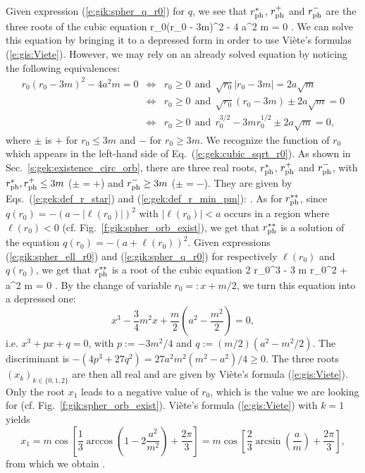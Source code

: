 Given expression (\ref{e:gik:spher_q_r0}) for $q$, we see that
$r_{\rm ph}^*$, $r_{\rm ph}^+$ and $r_{\rm ph}^-$
are the three roots of the cubic equation
\be
r_0(r_0 - 3m)^2 - 4 a^2 m  = 0 .
\ee
We can solve this equation by bringing it to a depressed form in order
to use Viète's formulas (\ref{e:gis:Viete}). However, we may rely on an
already solved equation by noticing the following equivalences:
\begin{eqnarray}
r_0(r_0 - 3m)^2 - 4 a^2 m  = 0  & \iff & r_0 \geq 0 \ \ \mbox{and} \ \
            \sqrt{r_0} | r_0 - 3 m | = 2 a\sqrt{m} \nonumber \\
& \iff &  r_0 \geq 0 \ \ \mbox{and} \ \
    \sqrt{r_0} (r_0 - 3 m ) \pm 2 a \sqrt{m} = 0 \nonumber \\
& \iff &  r_0 \geq 0 \ \ \mbox{and} \ \
    r_0^{3/2} - 3 m r_0^{1/2} \pm 2 a \sqrt{m} = 0 , \nonumber
\end{eqnarray}
where $\pm$ is $+$ for $r_0 \leq 3 m$ and $-$ for $r_0 \geq 3m$.
We recognize the function of $r_0$ which appears in the left-hand side
of Eq.~(\ref{e:gek:cubic_sqrt_r0}). As shown in Sec.~\ref{s:gek:existence_circ_orb},
there are three real roots,
$r_{\rm ph}^*$, $r_{\rm ph}^+$ and $r_{\rm ph}^-$, with
$r_{\rm ph}^*, r_{\rm ph}^+\leq 3m$ ($\pm = +$)
and $r_{\rm ph}^- \geq 3m$ ($\pm = -$). They are given by Eqs.~(\ref{e:gek:def_r_star})
and (\ref{e:gek:def_r_min_pm}):
\be \label{e:gik:rph_s}
    .
\ee
\be \label{e:gik:rph_pm}
   \encadre{ r_{\rm ph}^\pm := 4m\cos^2 \left[ \frac{1}{3} \arccos\left( \mp \frac{a}{m} \right) \right] }
\ee
As for $r_{\rm ph}^{**}$, since $q(r_0) = - (a - |\ell(r_0)|)^2$ with
$|\ell(r_0)|  < a$ occurs in a region where $\ell(r_0) < 0$ (cf. Fig.~\ref{f:gik:spher_orb_exist}),
we get that $r_{\rm ph}^{**}$ is a solution of the equation
$q(r_0) = - (a + \ell(r_0))^2$. Given expressions (\ref{e:gik:spher_ell_r0}) and (\ref{e:gik:spher_q_r0})
for respectively $\ell(r_0)$ and $q(r_0)$, we get that $r_{\rm ph}^{**}$ is a root of the cubic
equation
\be \label{e:gik:cubic_rph_ss}
    2 r_0^3 - 3 m r_0^2 + a^2 m = 0 .
\ee
By the change of variable $r_0 =: x + m/2$, we turn this equation into a depressed one:
\[
    x^3  - \frac{3}{4} m^2 x + \frac{m}{2} \left(a^2 - \frac{m^2}{2} \right) = 0 ,
\]
i.e. $x^3 + px + q = 0$, with $p:= -3m^2/4$ and $q:=(m/2)(a^2 - m^2/2)$.
The discriminant is $-(4 p^3 + 27 q^2) = 27 a^2 m^2 (m^2 - a^2)/4 \geq 0$. The three roots
$(x_k)_{k\in\{0,1,2\}}$ are then all real and are given by Viète's formula (\ref{e:gis:Viete}).
Only the root $x_1$ leads to a negative value of $r_0$, which is the value we
are looking for (cf. Fig.~\ref{f:gik:spher_orb_exist}). Viète's formula (\ref{e:gis:Viete})
with $k=1$ yields
\[
    x_1 = m \cos\left[ \frac{1}{3} \arccos\left(1 - 2 \frac{a^2}{m^2} \right) + \frac{2\pi}{3} \right]
        = m \cos\left[ \frac{2}{3} \arcsin\left(\frac{a}{m}\right) + \frac{2\pi}{3} \right] ,
\]
from which we obtain
\be \label{e:gik:rph_ss}
    .
\ee

